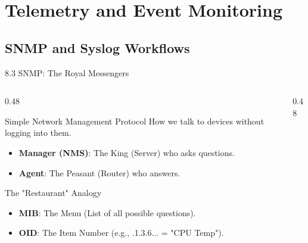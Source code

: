 \documentclass[aspectratio=169]{beamer}  %
\begin{document}
\section{Telemetry and Event Monitoring}
\subsection{SNMP and Syslog Workflows}


\begin{frame}{8.3 SNMP: The Royal Messengers}
    \begin{columns}[T]
        \begin{column}{0.48\textwidth}
            \begin{block}{Simple Network Management Protocol}
                \footnotesize
                How we talk to devices without logging into them.
                \begin{itemize}
                    \item \textbf{Manager (NMS)}: The King (Server) who asks questions.
                    \item \textbf{Agent}: The Peasant (Router) who answers.
                \end{itemize}
            \end{block}
            \begin{alertblock}{The "Restaurant" Analogy}
                \footnotesize
                \begin{itemize}
                    \item \textbf{MIB}: The Menu (List of all possible questions).
                    \item \textbf{OID}: The Item Number (e.g., .1.3.6... = "CPU Temp").
                \end{itemize}
            \end{alertblock}
        \end{column}
        \begin{column}{0.48\textwidth}
            \begin{center}
\end{center}
\end{column}
\end{columns}
\end{frame}
\end{document}
